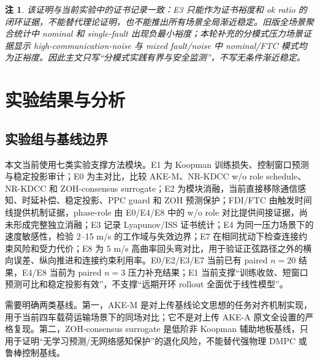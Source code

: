\documentclass[twocolumn,3p,times,procedia]{elsarticle}
\newcommand{\AKE}{AKE-M}
\newcommand{\Method}{NR-KDCC}
\newtheorem{remark}{注}
\begin{document}
\begin{remark}
该证明与当前实验中的证书记录一致：E3 只能作为证书裕度和 ok ratio 的闭环证据，不能替代理论证明，也不能推出所有场景全局渐近稳定。旧版全场景聚合统计中 nominal 和 single-fault 出现负最小裕度；本轮补充的分模式压力场景证据显示 high-communication-noise 与 mixed fault/noise 中 nominal/FTC 模式均为正裕度。因此主文只写“分模式实践有界与安全监测”，不写无条件渐近稳定。
\end{remark}

\section{实验结果与分析}

\subsection{实验组与基线边界}

本文当前使用七类实验支撑方法模块。E1 为 Koopman 训练损失、控制窗口预测与稳定投影审计；E0 为主对比，比较 \AKE{}、\Method{} w/o role schedule、\Method{} 和 ZOH-consensus surrogate；E2 为模块消融，当前直接移除通信感知、时延补偿、稳定投影、PPC guard 和 ZOH 预测保护；FDI/FTC 由触发时间线提供机制证据，phase-role 由 E0/E4/E8 中的 w/o role 对比提供间接证据，尚未形成完整独立消融；E3 记录 Lyapunov/ISS 证书统计；E4 为同一压力场景下的速度敏感性，检验 2--15 m/s 的工作域与失效边界；E7 在相同扰动下检查连接约束风险和受力代价；E8 为 5 m/s 高曲率回头弯对比，用于验证正弦路径之外的横向误差、纵向推进和连接约束利用率。E0/E2/E3/E7 当前已有 paired $n=20$ 结果，E4/E8 当前为 paired $n=3$ 压力补充结果；E1 当前支撑“训练收敛、短窗口预测可比和稳定投影有效”，不支撑“远期开环 rollout 全面优于线性模型”。

需要明确两类基线。第一，\AKE{} 是对上传基线论文思想的任务对齐机制实现，用于当前四车载荷运输场景下的同场对比；它不是对上传 AKE-A 原文全设置的严格复现。第二，ZOH-consensus surrogate 是低阶非 Koopman 辅助地板基线，只用于证明“无学习预测/无网络感知保护”的退化风险，不能替代强物理 DMPC 或鲁棒控制基线。
\end{document}
